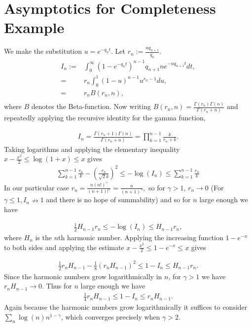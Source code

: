 \documentclass[12pt]{article}
\theoremstyle{definition}
\begin{document}
\section{Asymptotics for Completeness Example}
We make the substitution $u = e^{-q_nt}$. Let $r_n := \frac{nq_{n+1}}{q_{n}}$.
\begin{align*}
    I_n :=& \int_0^\infty (1-e^{-q_nt})^{n-1}q_{n+1}ne^{-nq_{n+1}t} dt,\\
    =& r_n\int_{0}^1 (1-u)^{n-1}u^{r_n-1}du, \\
    =& r_n B(r_n,n), \\
\end{align*} where $B$ denotes the Beta-function. Now writing $B(r_n,n) = \frac{\Gamma(r_n)\Gamma(n)}{\Gamma(r_n+n)}$ and repeatedly applying the recursive identity for the gamma function,

\begin{align*}
    I_n = \frac{\Gamma(r_n+1)\Gamma(n)}{\Gamma(r_n+n)} = \prod_{k=1}^{n-1}\frac{k}{r_n+k}.
\end{align*}
Taking logarithms and applying the elementary inequality $x - \frac{x^2}{2} \leq \log(1+x) \leq x$ gives
\begin{align*}
\sum_{k=1}^{n-1} \frac{r_n}{k}-\left(\frac{r_n}{\sqrt{2}k}\right)^2\leq -\log(I_n) \leq \sum_{k=1}^{n-1} \frac{r_n}{k}
\end{align*}
In our particular case $r_n = \frac{n(n!)^\gamma}{(n+1)!^\gamma} = \frac{n}{(n+1)^\gamma},$ 
so for $\gamma > 1$, $r_n \rightarrow 0$ (For $\gamma \leq 1, I_n \nrightarrow 1$ and there is no hope of summability) and so for $n$ large enough we have

\begin{align*}
\frac{1}{2}H_{n-1}r_n \leq -\log(I_n) \leq H_{n-1}r_n,
\end{align*} where $H_n$ is the $n$th harmonic number. Applying the increasing function $1-e^{-x}$ to both sides and applying the estimate $x-\frac{x^2}{2} \leq 1-e^{-x} \leq x$ gives

\begin{align*}
    \frac{1}{2}r_n H_{n-1}-\frac{1}{8}(r_nH_{n-1})^2 \leq 1- I_n \leq H_{n-1}r_n.
\end{align*}
Since the harmonic numbers grow logarithmically in $n$, for $\gamma>1$ we have $r_n H_{n-1} \rightarrow 0$. Thus for $n$ large enough we have 
\begin{align*}
    \frac{1}{4}r_n H_{n-1}\leq 1- I_n \leq r_nH_{n-1}.
\end{align*}
Again because the harmonic numbers grow logarithmically it suffices to consider $\sum_n \log(n)n^{1-\gamma}$, which converges precisely when $\gamma > 2$.
\end{document}
